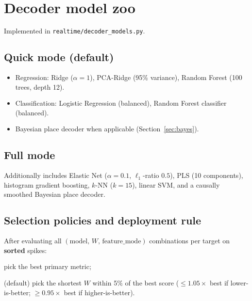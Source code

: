 \documentclass[11pt,a4paper]{article}
\begin{document}
\section{Decoder model zoo}

Implemented in \texttt{realtime/decoder\_models.py}.

\subsection{Quick mode (default)}
\begin{itemize}[leftmargin=*]
  \item Regression: Ridge ($\alpha=1$), PCA-Ridge (95\% variance), Random Forest (100 trees, depth 12).
  \item Classification: Logistic Regression (balanced), Random Forest classifier (balanced).
  \item Bayesian place decoder when applicable (Section~\ref{sec:bayes}).
\end{itemize}

\subsection{Full mode}
Additionally includes Elastic Net ($\alpha=0.1$, $\ell_1$-ratio $0.5$), PLS (10 components), histogram gradient boosting, $k$-NN ($k=15$), linear SVM, and a causally smoothed Bayesian place decoder.

\subsection{Selection policies and deployment rule}
\label{sec:deployment-selection}
After evaluating all $(\mathrm{model},\,W,\,\mathrm{feature\_mode})$ combinations per target on \textbf{sorted} spikes:
\begin{description}[leftmargin=*]
  \item[\texttt{best\_accuracy}] pick the best primary metric;
  \item[\texttt{shortest\_near\_optimal}] (default) pick the shortest $W$ within 5\% of the best score
  ($\le 1.05\times$ best if lower-is-better; $\ge 0.95\times$ best if higher-is-better).
\end{description}
\end{document}
